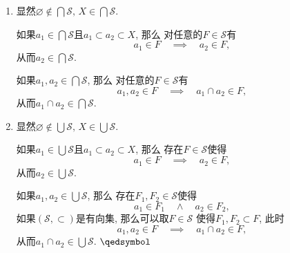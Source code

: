 
\begin{enumerate}
    \item 显然$\displaystyle\varnothing\notin\bigcap\mathcal{S},
    \,X\in\bigcap\mathcal{S}$.

    \vspace{3pt}\hspace{2.17em}
    如果$\displaystyle a_1\in\bigcap\mathcal{S}$且$a_1\subset a_2\subset X$, 那么
    对任意的$F\in\mathcal{S}$有
    \[
        a_1\in F\quad\implies\quad a_2\in F,
    \]
    从而$\displaystyle a_2\in\bigcap\mathcal{S}$.

    \vspace{3pt}\hspace{2.17em}
    如果$\displaystyle a_1,a_2\in\bigcap\mathcal{S}$, 那么
    对任意的$F\in\mathcal{S}$有
    \[
        a_1,a_2\in F\quad\implies\quad a_1\cap a_2\in F,
    \]
    从而$\displaystyle a_1\cap a_2\in\bigcap\mathcal{S}$.

    \vspace{3pt}
    \item 显然$\displaystyle\varnothing\notin\bigcup\mathcal{S},
    \,X\in\bigcup\mathcal{S}$.

    \vspace{3pt}\hspace{2.17em}
    如果$\displaystyle a_1\in\bigcup\mathcal{S}$且$a_1\subset a_2\subset X$, 那么
    存在$F\in\mathcal{S}$使得
    \[
        a_1\in F\quad\implies\quad a_2\in F,
    \]
    从而$\displaystyle a_2\in\bigcup\mathcal{S}$.
    
    \vspace{3pt}\hspace{2.17em}
    如果$\displaystyle a_1,a_2\in\bigcup\mathcal{S}$, 那么
    存在$F_1,F_2\in\mathcal{S}$使得
    \[
        a_1\in F_1\quad\land\quad a_2\in F_2,
    \]
    如果$(\mathcal{S},\subset)$是有向集, 那么可以取$F\in\mathcal{S}$
    使得$F_1,F_2\subset F$, 此时
    \[
        a_1,a_2\in F\quad\implies\quad a_1\cap a_2\in F,
    \]
    从而$\displaystyle a_1\cap a_2\in\bigcup\mathcal{S}$. \hfill $\qedsymbol$
\end{enumerate}

